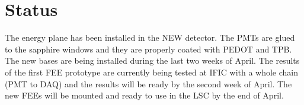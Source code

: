 \section{Status}\label{sec_energy_status}

The energy plane has been installed in the NEW detector. The PMTs are glued to the sapphire windows and they are properly coated with PEDOT and TPB. The new bases are being installed during the last two weeks of April. The results of the first FEE prototype are currently being tested at IFIC with a whole chain (PMT to DAQ) and the results will be ready by the second week of April. The new FEEs will be mounted and ready to use in the LSC by the end of April.

